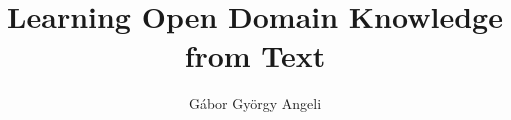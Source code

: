 \documentclass[12pt]{report}
\begin{document}
\title{Learning Open Domain Knowledge from Text}
\author{G\'{a}bor Gy\"{o}rgy Angeli}

\beforepreface


\afterpreface


%
%
%
%
%
%
%
%
%
%
%
%
%
%
%
%
%
%
%
%
%
%
%
%
%
%
%




\appendix




\end{document}
